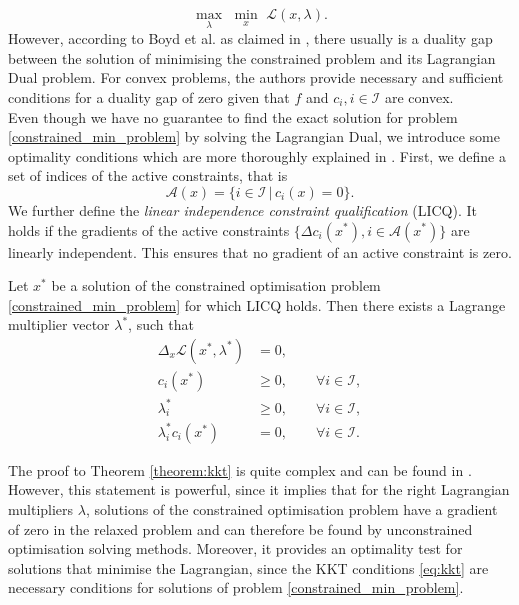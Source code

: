 \[ \underset{\lambda}{\max}\,\, \underset{x}{\min}\,\, \mathcal{L}(x, \lambda). \]
However, according to Boyd et al. as claimed in \cite{Boyd:2004:CO:993483}, there usually is a duality gap between the solution of minimising the constrained problem and its Lagrangian Dual problem. For convex problems, the authors provide necessary and sufficient conditions for a duality gap of zero given that $f$ and $c_i, i \in \mathcal{I}$ are convex.\\
\indent Even though we have no guarantee to find the exact solution for problem \eqref{constrained_min_problem} by solving the Lagrangian Dual, we introduce some optimality conditions which are more thoroughly explained in \cite{NoceWrig06}. First, we define a set of indices of the active constraints, that is
\[ \mathcal{A}(x) = \{ i \in \mathcal{I} \,|\, c_i(x) = 0 \}. \]
We further define the \textit{linear independence constraint qualification} (LICQ). It holds if the gradients of the active constraints $\{ \Delta c_i(x^*), i \in \mathcal{A}(x^*) \}$ are linearly independent. This ensures that no gradient of an active constraint is zero.
\begin{theorem}$\,$\\
	\label{theorem:kkt}
Let $x^*$ be a solution of the constrained optimisation problem \eqref{constrained_min_problem} for which LICQ holds. Then there exists a Lagrange multiplier vector $\lambda^*$, such that
\begin{subequations}
	\label{eq:kkt}
	\begin{align}
	\Delta_x \mathcal{L}(x^*, \lambda^*) &= 0,\\
	c_i(x^*) &\geq 0, \qquad \forall i \in \mathcal{I},\\
	\lambda^*_i &\geq 0, \qquad \forall i \in \mathcal{I},\\
	\lambda^*_i  c_i(x^*) &= 0, \qquad \forall i \in \mathcal{I}.
	\end{align}
\end{subequations}
\end{theorem}

The proof to Theorem \ref{theorem:kkt} is quite complex and can be found in \cite{NoceWrig06}. However, this statement is powerful, since it implies that for the right Lagrangian multipliers $\lambda$, solutions of the constrained optimisation problem have a gradient of zero in the relaxed problem and can therefore be found by unconstrained optimisation solving methods. Moreover, it provides an optimality test for solutions that minimise the Lagrangian, since the KKT conditions \eqref{eq:kkt} are necessary conditions for solutions of problem \eqref{constrained_min_problem}.\\



